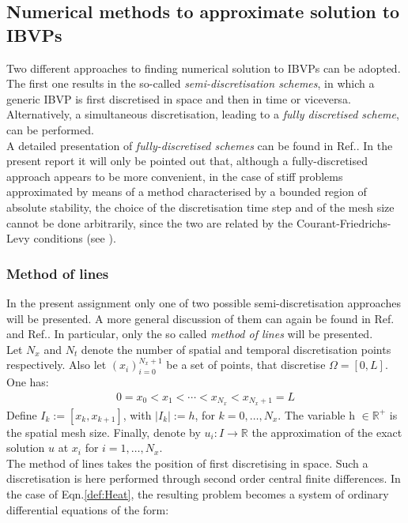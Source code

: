 \documentclass[11pt]{article}
\theoremstyle{theorem}
\theoremstyle{definition}
\begin{document}
\subsection{Numerical methods to approximate solution to IBVPs}
Two different approaches to finding numerical solution to IBVPs can be adopted. The first one results in the so-called \emph{semi-discretisation schemes}, in which a generic IBVP is first discretised in space and then in time or viceversa. Alternatively, a simultaneous discretisation, leading to a \emph{fully discretised scheme}, can be performed.\\
A detailed presentation of \emph{fully-discretised schemes} can be found in Ref.\cite{numerical-math}. In the present report it will only be pointed out that, although a fully-discretised approach appears to be more convenient, in the case of stiff problems approximated by means of a method characterised by a bounded region of absolute stability, the choice of the discretisation time step and of the mesh size cannot be done arbitrarily, since the two are related by the Courant-Friedrichs-Levy conditions (see \cite{numerical-math}).\\

\subsubsection{Method of lines}
In the present assignment only one of two possible semi-discretisation approaches will be presented. A more general discussion of them can again be found in Ref.\cite{numerical-math} and Ref.\cite{lec-notes}. In particular, only the so called \emph{method of lines} will be presented.\\

Let $ N_x $ and $ N_t $ denote the number of spatial and temporal discretisation points respectively. Also let $ (x_i)_{i=0}^{N_x + 1} $ be a set of points, that discretise $ \Omega = [0,L] $. One has:
\begin{align*}
0 = x_0 < x_1 < \cdots < x_{N_x} < x_{N_x + 1} = L
\end{align*}
Define $ I_k := [x_{k},x_{k+1}] $, with $ |I_k| := h $, for $ k = 0,\ldots,N_x $. The variable h $\in  \mathbb{R}^+$  is the spatial mesh size. Finally, denote by $ u_i : I \to \mathbb{R}$ the approximation of the exact solution $ u $ at $ x_i $ for $ i = 1,\ldots,N_x $.
\\
The method of lines takes the position of first discretising in space. Such a discretisation is here performed through second order central finite differences. In the case of Eqn.\eqref{def:Heat}, the resulting problem becomes a system of ordinary differential equations of the form:
\end{document}
